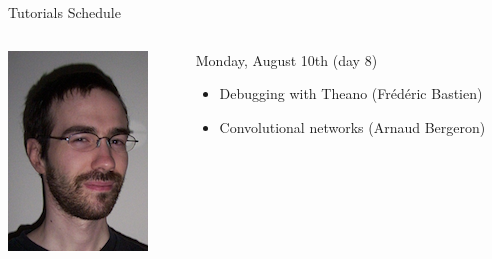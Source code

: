 \documentclass[a4paper,9pt]{beamer}
\begin{document}
\begin{frame}{Tutorials Schedule}
{\begin{columns}
\begin{column}{.07\textwidth}
          \includegraphics[width=\columnwidth]{abergeron.png}
        \end{column}
        \begin{column}{.8\textwidth}
          \scriptsize
          Monday, August 10th (day 8)
          \begin{itemize}
            \item Debugging with Theano (Frédéric Bastien)
            \item Convolutional networks (Arnaud Bergeron)
          \end{itemize}
          \vspace{2mm}
        \end{column}
      \end{columns}
    }


\end{frame}
\end{document}
